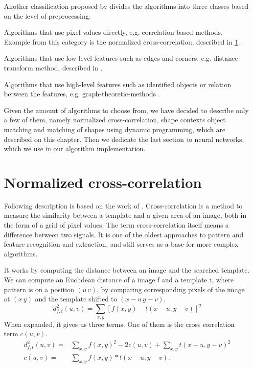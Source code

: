 Another classification proposed by \citet{distanceTransform} divides the algorithms into three classes based on the level of preprocessing:
\begin{description}
\item Algorithms that use pixel values directly, e.g. correlation-based methods. Example from this category is the normalized cross-correlation, described in \cref{normalizedCC}.
\item Algorithms that use low-level features such as edges and corners, e.g. distance transform method, described in \citet{distanceTransform}.
\item Algorithms that use high-level features such as identified objects or relation between the features, e.g. graph-theoretic-methods \cite{graph}.
\end{description}

Given the amount of algorithms to choose from, we have decided to describe only a few of them, namely normalized cross-correlation, shape contexts object matching and matching of shapes using dynamic programming, which are described on this chapter. Then we dedicate the last section to neural networks, which we use in our algorithm implementation.

\section{Normalized cross-correlation}
\label{normalizedCC}
Following description is based on the work of \cite{crossCorrLewis}.
Cross-correlation is a method to measure the similarity between a template and a given area of an image, both in the form of a grid of pixel values. The term cross-correlation itself means a difference between two signals. It is one of the oldest approaches to pattern and feature recognition and extraction, and still serves as a base for more complex algorithms.

It works by computing the distance between an image and the searched template. We can compute an Euclidean distance of a image f and a template t, where pattern is on a position $(u\,v)$, by comparing corresponding pixels of the image at $(x\,y)$ and the template shifted to $(x-u\,y-v)$.
\[d_{f,t}^{2}(u,v)=\sum_{x,y} [ f(x,y) - t(x-u, y-v) ]^{2}\]
When expanded, it gives us three terms. One of them is the cross correlation term $c(u,v)$.
\begin{align*}
d_{f,t}^{2}(u,v)=&\sum_{x,y} f(x,y)^{2} - 2c(u,v) + \sum_{x,y} t(x-u, y-v)^2 \\
c(u,v)=&\sum_{x,y} f(x,y) * t(x-u, y-v).
\end{align*}

